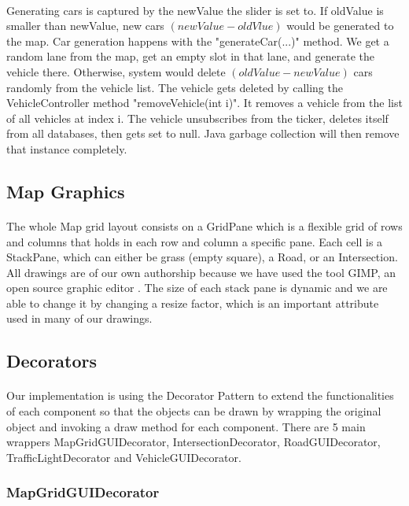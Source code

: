 \documentclass[a4paper,11pt,titlepage]{article}
\begin{document}
\paragraph{}
Generating cars is captured by the newValue the slider is set to. 
If oldValue is smaller than newValue, new cars $(newValue - oldVlue)$ would be generated to the map. 
Car generation happens with the "generateCar(...)" method. We get a random lane from the map, get an empty slot in that lane, and generate the vehicle there.
Otherwise, system would delete $(oldValue - newValue)$ cars randomly from the vehicle list. The vehicle gets deleted by calling the VehicleController method "removeVehicle(int i)". It removes a vehicle from the list of all vehicles at index i. The vehicle unsubscribes from the ticker, deletes itself from all databases, then gets set to null. Java garbage collection will then remove that instance completely.

\subsection{Map Graphics}
\paragraph{}
The whole Map grid layout consists on a GridPane which is a flexible grid of rows and columns that holds in each row and column a specific pane. Each cell is a StackPane, which can either be grass (empty square), a Road, or an Intersection. All drawings are of our own authorship because we have used the tool GIMP, an open source graphic editor \cite{gimp}. The size of each stack pane is dynamic and we are able to change it by changing a resize factor, which is an important attribute used in many of our drawings. 
\subsection{Decorators}
\paragraph{}
Our implementation is using the Decorator Pattern to extend the functionalities of each component so that the objects can be drawn by wrapping the original object and invoking a draw method for each component. There are 5 main wrappers MapGridGUIDecorator, IntersectionDecorator, RoadGUIDecorator, TrafficLightDecorator and VehicleGUIDecorator.
\subsubsection{MapGridGUIDecorator}
\end{document}
